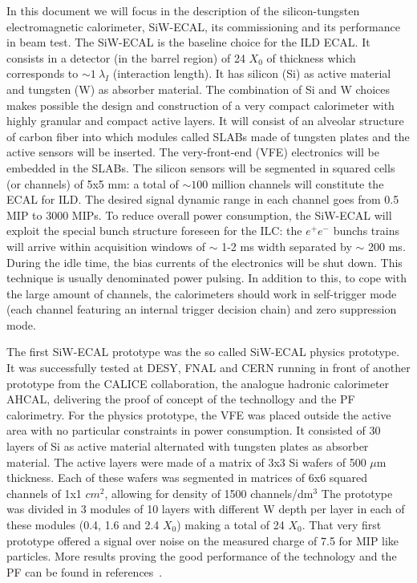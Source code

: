 \documentclass[final,3p,times,twocolumn]{elsarticle}
\begin{document}
In this document we will focus in the description of the silicon-tungsten electromagnetic calorimeter,
SiW-ECAL, its commissioning and its performance in beam test.
The SiW-ECAL is the baseline choice for the ILD ECAL. It consists in a detector (in the barrel region) of 24 $X_{0}$ of thickness which corresponds to $\sim 1~\lambda_{I}$ (interaction length).
It has silicon (Si) as active material and tungsten (W) as absorber material.
The combination of Si and W choices  makes possible the design and construction
of a very compact calorimeter with highly granular and compact active layers.
It will consist of an alveolar structure of carbon fiber into which modules called SLABs made of tungsten
plates and the active sensors will be inserted. The very-front-end (VFE) electronics will be
embedded in the SLABs. The silicon sensors will be segmented
in squared cells (or channels) of 5x5 mm: a total of $\sim 100$ million channels will constitute the ECAL for ILD.
The desired signal dynamic range in each channel goes from 0.5 MIP to 3000 MIPs.
To reduce overall power consumption, the SiW-ECAL will exploit the special bunch structure
foreseen for the ILC: the $e^{+}e^{-}$ bunchs trains will arrive within
acquisition windows of $\sim$ 1-2 ms width separated by $\sim$ 200 ms. During the idle time, the bias currents of the electronics will be shut down.
This technique is usually denominated power pulsing. In addition to this, to cope with the large amount of channels, the calorimeters should work in self-trigger mode (each channel featuring an internal trigger decision chain) and zero suppression mode. 

The first SiW-ECAL prototype was the so called SiW-ECAL physics prototype.
It was successfully tested at DESY, FNAL and CERN running in front of another prototype from the CALICE
collaboration, the analogue hadronic calorimeter AHCAL, delivering the proof of concept of the technollogy
and the PF calorimetry.
For the physics prototype, the VFE was placed outside the active area with no particular constraints in power consumption.
It consisted of 30 layers of Si as active material alternated with tungsten plates as absorber material.
The active layers were made of a matrix of 3x3 Si wafers of 500 $\mu$m thickness. Each of these wafers was segmented in matrices of
6x6 squared channels of 1x1 $cm^{2}$, allowing for density of 1500 channels/dm$^{3}$
The prototype was divided in 3 modules of 10 layers with different W depth per layer in each of these modules
(0.4, 1.6 and 2.4 $X_{0}$) making a total of 24 $X_{0}$.
That very first prototype offered a signal over noise on the measured charge of 7.5 for MIP like 
particles. More results proving the good performance of the technology and the PF can be found in
references~\cite{Adloff:2011ha,Anduze:2008hq,Adloff:2008aa,Adloff:2010xj,CALICE:2011aa,Bilki:2014uep}. 
\end{document}
